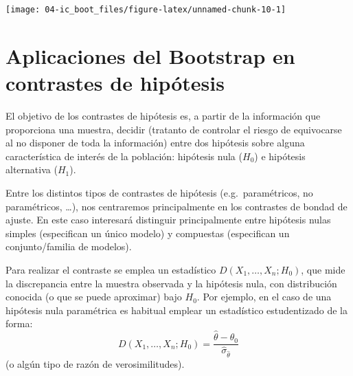 \documentclass[
]{book}
\newenvironment{Shaded}{\begin{snugshade}}{\end{snugshade}}
\newcommand{\AttributeTok}[1]{\textcolor[rgb]{0.77,0.63,0.00}{#1}}
\newcommand{\ConstantTok}[1]{\textcolor[rgb]{0.00,0.00,0.00}{#1}}
\newcommand{\DecValTok}[1]{\textcolor[rgb]{0.00,0.00,0.81}{#1}}
\newcommand{\FunctionTok}[1]{\textcolor[rgb]{0.00,0.00,0.00}{#1}}
\newcommand{\NormalTok}[1]{#1}
\newcommand{\OtherTok}[1]{\textcolor[rgb]{0.56,0.35,0.01}{#1}}
\newcommand{\SpecialCharTok}[1]{\textcolor[rgb]{0.00,0.00,0.00}{#1}}
\newcommand{\StringTok}[1]{\textcolor[rgb]{0.31,0.60,0.02}{#1}}
\theoremstyle{break}
\theoremstyle{definition}
\theoremstyle{definition}
\theoremstyle{definition}
\theoremstyle{definition}
\theoremstyle{remark}
\begin{document}
\begin{Shaded}
\end{Shaded}

\begin{center}\texttt{[image: 04-ic\_boot\_files/figure-latex/unnamed-chunk-10-1]} \end{center}

\hypertarget{contrastes}{%
\chapter{Aplicaciones del Bootstrap en contrastes de hipótesis}\label{contrastes}}

El objetivo de los contrastes de hipótesis es, a partir de la información
que proporciona una muestra, decidir (tratanto de controlar el riesgo de
equivocarse al no disponer de toda la información)
entre dos hipótesis sobre alguna característica de interés de la población:
hipótesis nula (\(H_{0}\)) e hipótesis alternativa (\(H_{1}\)).

Entre los distintos tipos de contrastes de hipótesis (e.g.~paramétricos,
no paramétricos, \ldots), nos centraremos principalmente en los contrastes
de bondad de ajuste. En este caso interesará distinguir principalmente
entre hipótesis nulas simples (especifican un único modelo) y compuestas
(especifican un conjunto/familia de modelos).

Para realizar el contraste se emplea un estadístico \(D\left( X_1,\ldots ,X_n;H_0\right)\),
que mide la discrepancia entre la muestra observada y la hipótesis nula,
con distribución conocida (o que se puede aproximar) bajo \(H_0\).
Por ejemplo, en el caso de una hipótesis nula paramétrica
es habitual emplear un estadístico estudentizado de la forma:
\[D\left( X_1,\ldots ,X_n;H_0\right) =
\frac{\hat{\theta}-\theta _0}{\hat\sigma_{\hat\theta}}\]
(o algún tipo de razón de verosimilitudes).
\end{document}
